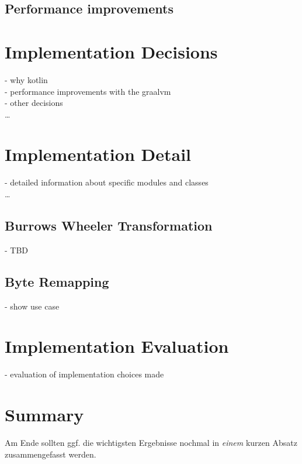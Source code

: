 \subsection{Performance improvements}

\section{Implementation Decisions}
\label{ch:Conceptual Design:sec:Implementation Decisions}
- why kotlin\\
- performance improvements with the graalvm\\
- other decisions\\
\ldots

\section{Implementation Detail}
\label{ch:Conceptual Design:sec:Implementation Detail}
- detailed information about specific modules and classes\\
\ldots

\subsection{Burrows Wheeler Transformation}
- TBD\\
\subsection{Byte Remapping}
- show use case \\

\section{Implementation Evaluation}
\label{ch:Conceptual Design:sec:Implementation Evaluation}
- evaluation of implementation choices made


\section{Summary}
\label{ch:Conceptual Design:sec:Summary}

Am Ende sollten ggf. die wichtigsten Ergebnisse nochmal in \emph{einem}
kurzen Absatz zusammengefasst werden.

